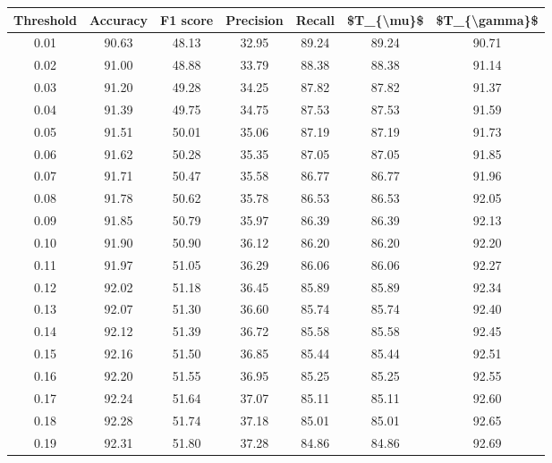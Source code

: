 \begin{tabular}{|c|c|c|c|c|c|c|}
\hline
 Threshold &  Accuracy &  F1 score &  Precision &  Recall &  \$T\_\{\textbackslash mu\}\$ &  \$T\_\{\textbackslash gamma\}\$ \\
\hline
      0.01 &     90.63 &     48.13 &      32.95 &   89.24 &      89.24 &         90.71 \\
      0.02 &     91.00 &     48.88 &      33.79 &   88.38 &      88.38 &         91.14 \\
      0.03 &     91.20 &     49.28 &      34.25 &   87.82 &      87.82 &         91.37 \\
      0.04 &     91.39 &     49.75 &      34.75 &   87.53 &      87.53 &         91.59 \\
      0.05 &     91.51 &     50.01 &      35.06 &   87.19 &      87.19 &         91.73 \\
      0.06 &     91.62 &     50.28 &      35.35 &   87.05 &      87.05 &         91.85 \\
      0.07 &     91.71 &     50.47 &      35.58 &   86.77 &      86.77 &         91.96 \\
      0.08 &     91.78 &     50.62 &      35.78 &   86.53 &      86.53 &         92.05 \\
      0.09 &     91.85 &     50.79 &      35.97 &   86.39 &      86.39 &         92.13 \\
      0.10 &     91.90 &     50.90 &      36.12 &   86.20 &      86.20 &         92.20 \\
      0.11 &     91.97 &     51.05 &      36.29 &   86.06 &      86.06 &         92.27 \\
      0.12 &     92.02 &     51.18 &      36.45 &   85.89 &      85.89 &         92.34 \\
      0.13 &     92.07 &     51.30 &      36.60 &   85.74 &      85.74 &         92.40 \\
      0.14 &     92.12 &     51.39 &      36.72 &   85.58 &      85.58 &         92.45 \\
      0.15 &     92.16 &     51.50 &      36.85 &   85.44 &      85.44 &         92.51 \\
      0.16 &     92.20 &     51.55 &      36.95 &   85.25 &      85.25 &         92.55 \\
      0.17 &     92.24 &     51.64 &      37.07 &   85.11 &      85.11 &         92.60 \\
      0.18 &     92.28 &     51.74 &      37.18 &   85.01 &      85.01 &         92.65 \\
      0.19 &     92.31 &     51.80 &      37.28 &   84.86 &      84.86 &         92.69 \\

\end{tabular}
